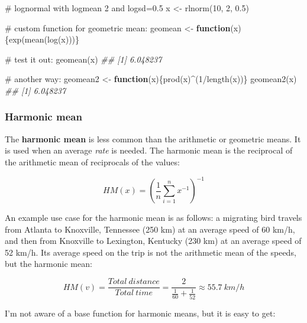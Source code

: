 \documentclass[
  13,
  letterpaper,
]{report}
\newenvironment{Shaded}{\begin{snugshade}}{\end{snugshade}}
\newcommand{\CommentTok}[1]{\textcolor[rgb]{0.37,0.37,0.37}{#1}}
\newcommand{\ControlFlowTok}[1]{\textcolor[rgb]{0.00,0.23,0.31}{\textbf{#1}}}
\newcommand{\DecValTok}[1]{\textcolor[rgb]{0.68,0.00,0.00}{#1}}
\newcommand{\DocumentationTok}[1]{\textcolor[rgb]{0.37,0.37,0.37}{\textit{#1}}}
\newcommand{\FloatTok}[1]{\textcolor[rgb]{0.68,0.00,0.00}{#1}}
\newcommand{\FunctionTok}[1]{\textcolor[rgb]{0.28,0.35,0.67}{#1}}
\newcommand{\NormalTok}[1]{\textcolor[rgb]{0.00,0.23,0.31}{#1}}
\newcommand{\OtherTok}[1]{\textcolor[rgb]{0.00,0.23,0.31}{#1}}
\newcommand{\SpecialCharTok}[1]{\textcolor[rgb]{0.37,0.37,0.37}{#1}}
\begin{document}
\begin{Shaded}
\begin{Highlighting}[]

\CommentTok{\# lognormal with logmean 2 and logsd=0.5}
\NormalTok{x }\OtherTok{\textless{}{-}} \FunctionTok{rlnorm}\NormalTok{(}\DecValTok{10}\NormalTok{, }\DecValTok{2}\NormalTok{, }\FloatTok{0.5}\NormalTok{)}

\CommentTok{\# custom function for geometric mean:}
\NormalTok{geomean }\OtherTok{\textless{}{-}} \ControlFlowTok{function}\NormalTok{(x)\{}\FunctionTok{exp}\NormalTok{(}\FunctionTok{mean}\NormalTok{(}\FunctionTok{log}\NormalTok{(x)))\}}

\CommentTok{\# test it out:}
\FunctionTok{geomean}\NormalTok{(x)}
\DocumentationTok{\#\# [1] 6.048237}

\CommentTok{\# another way:}
\NormalTok{geomean2 }\OtherTok{\textless{}{-}} \ControlFlowTok{function}\NormalTok{(x)\{}\FunctionTok{prod}\NormalTok{(x)}\SpecialCharTok{\^{}}\NormalTok{(}\DecValTok{1}\SpecialCharTok{/}\FunctionTok{length}\NormalTok{(x))\}}
\FunctionTok{geomean2}\NormalTok{(x)}
\DocumentationTok{\#\# [1] 6.048237}
\end{Highlighting}
\end{Shaded}

\subsubsection{Harmonic mean}\label{sec-desc-cen-mean-hm}

The \textbf{harmonic mean} is less common than the arithmetic or
geometric means. It is used when an average \emph{rate} is needed. The
harmonic mean is the reciprocal of the arithmetic mean of reciprocals of
the values:

\[HM\left(x\right)=\left(\frac{1}{n}\sum_{i=1}^{n}x^{-1}\right)^{-1}\]

An example use case for the harmonic mean is as follows: a migrating
bird travels from Atlanta to Knoxville, Tennessee (250 km) at an average
speed of 60 km/h, and then from Knoxville to Lexington, Kentucky (230
km) at an average speed of 52 km/h. Its average speed on the trip is not
the arithmetic mean of the speeds, but the harmonic mean:

\[HM\left(v\right)=\frac{Total\ distance}{Total\ time}=\frac{2}{\frac{1}{60}+\frac{1}{52}}\approx55.7\ km/h\]

I'm not aware of a base function for harmonic means, but it is easy to
get:
\end{document}
